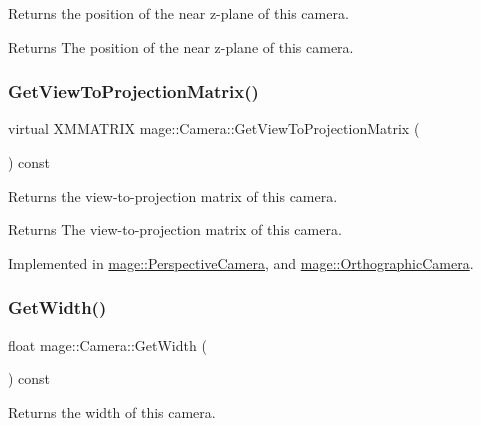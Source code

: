 Returns the position of the near z-\/plane of this camera.

\begin{DoxyReturn}{Returns}
The position of the near z-\/plane of this camera. 
\end{DoxyReturn}
\hypertarget{classmage_1_1_camera_a1f5206864cf18b5548219492556df5d2}{}\label{classmage_1_1_camera_a1f5206864cf18b5548219492556df5d2} 
\subsubsection{\texorpdfstring{Get\+View\+To\+Projection\+Matrix()}{GetViewToProjectionMatrix()}}
{\footnotesize\ttfamily virtual X\+M\+M\+A\+T\+R\+IX mage\+::\+Camera\+::\+Get\+View\+To\+Projection\+Matrix (\begin{DoxyParamCaption}{ }\end{DoxyParamCaption}) const\hspace{0.3cm}{\ttfamily [pure virtual]}}

Returns the view-\/to-\/projection matrix of this camera.

\begin{DoxyReturn}{Returns}
The view-\/to-\/projection matrix of this camera. 
\end{DoxyReturn}


Implemented in \hyperlink{classmage_1_1_perspective_camera_a83a38a4e8180707df2323130f9cee4a5}{mage\+::\+Perspective\+Camera}, and \hyperlink{classmage_1_1_orthographic_camera_aedd86e56a0f7bc967ad8d9be2631a0cf}{mage\+::\+Orthographic\+Camera}.

\hypertarget{classmage_1_1_camera_a2285655605035118861297b2449a3443}{}\label{classmage_1_1_camera_a2285655605035118861297b2449a3443} 
\subsubsection{\texorpdfstring{Get\+Width()}{GetWidth()}}
{\footnotesize\ttfamily float mage\+::\+Camera\+::\+Get\+Width (\begin{DoxyParamCaption}{ }\end{DoxyParamCaption}) const}

Returns the width of this camera.

